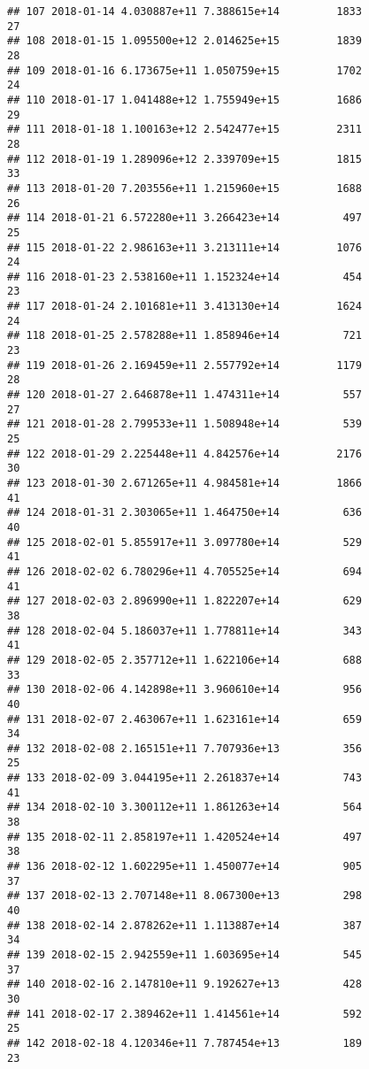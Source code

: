 \documentclass[]{article}
\begin{document}
\begin{verbatim}
## 107 2018-01-14 4.030887e+11 7.388615e+14         1833              27
## 108 2018-01-15 1.095500e+12 2.014625e+15         1839              28
## 109 2018-01-16 6.173675e+11 1.050759e+15         1702              24
## 110 2018-01-17 1.041488e+12 1.755949e+15         1686              29
## 111 2018-01-18 1.100163e+12 2.542477e+15         2311              28
## 112 2018-01-19 1.289096e+12 2.339709e+15         1815              33
## 113 2018-01-20 7.203556e+11 1.215960e+15         1688              26
## 114 2018-01-21 6.572280e+11 3.266423e+14          497              25
## 115 2018-01-22 2.986163e+11 3.213111e+14         1076              24
## 116 2018-01-23 2.538160e+11 1.152324e+14          454              23
## 117 2018-01-24 2.101681e+11 3.413130e+14         1624              24
## 118 2018-01-25 2.578288e+11 1.858946e+14          721              23
## 119 2018-01-26 2.169459e+11 2.557792e+14         1179              28
## 120 2018-01-27 2.646878e+11 1.474311e+14          557              27
## 121 2018-01-28 2.799533e+11 1.508948e+14          539              25
## 122 2018-01-29 2.225448e+11 4.842576e+14         2176              30
## 123 2018-01-30 2.671265e+11 4.984581e+14         1866              41
## 124 2018-01-31 2.303065e+11 1.464750e+14          636              40
## 125 2018-02-01 5.855917e+11 3.097780e+14          529              41
## 126 2018-02-02 6.780296e+11 4.705525e+14          694              41
## 127 2018-02-03 2.896990e+11 1.822207e+14          629              38
## 128 2018-02-04 5.186037e+11 1.778811e+14          343              41
## 129 2018-02-05 2.357712e+11 1.622106e+14          688              33
## 130 2018-02-06 4.142898e+11 3.960610e+14          956              40
## 131 2018-02-07 2.463067e+11 1.623161e+14          659              34
## 132 2018-02-08 2.165151e+11 7.707936e+13          356              25
## 133 2018-02-09 3.044195e+11 2.261837e+14          743              41
## 134 2018-02-10 3.300112e+11 1.861263e+14          564              38
## 135 2018-02-11 2.858197e+11 1.420524e+14          497              38
## 136 2018-02-12 1.602295e+11 1.450077e+14          905              37
## 137 2018-02-13 2.707148e+11 8.067300e+13          298              40
## 138 2018-02-14 2.878262e+11 1.113887e+14          387              34
## 139 2018-02-15 2.942559e+11 1.603695e+14          545              37
## 140 2018-02-16 2.147810e+11 9.192627e+13          428              30
## 141 2018-02-17 2.389462e+11 1.414561e+14          592              25
## 142 2018-02-18 4.120346e+11 7.787454e+13          189              23

\end{verbatim}
\end{document}
